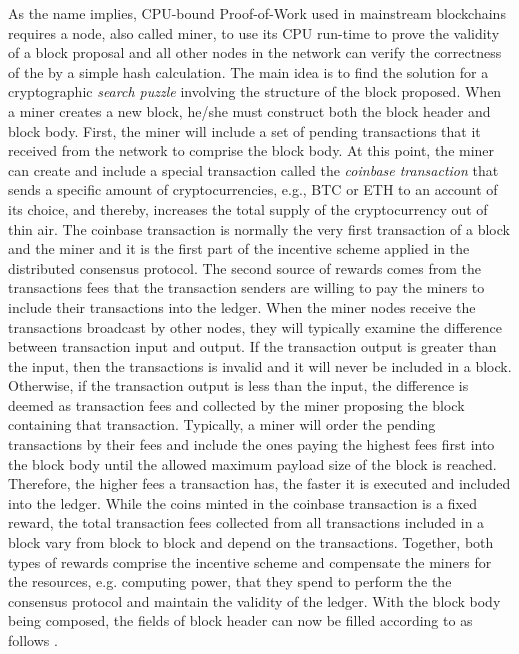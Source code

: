 As the name implies, CPU-bound Proof-of-Work used in mainstream blockchains requires a node, also called miner, to use its CPU run-time to prove the validity of a block proposal and all other nodes in the network can verify the correctness of the by a simple hash calculation. The main idea is to find the solution for a cryptographic \textit{search puzzle} involving the structure of the block proposed. When a miner creates a new block, he/she must construct both the block header and block body. First, the miner will include a set of pending transactions that it received from the network to comprise the block body. At this point, the miner can create and include a special transaction called the \textit{coinbase transaction} that sends a specific amount of cryptocurrencies, e.g., BTC or ETH to an account of its choice, and thereby, increases the total supply of the cryptocurrency out of thin air. The coinbase transaction is normally the very first transaction of a block and the miner and it is the first part of the incentive scheme applied in the distributed consensus protocol. The second source of rewards comes from the transactions fees that the transaction senders are willing to pay the miners to include their transactions into the ledger. When the miner nodes receive the transactions broadcast by other nodes, they will typically examine the difference between transaction input and output. If the transaction output is greater than the input, then the transactions is invalid and it will never be included in a block. Otherwise, if the transaction output is less than the input, the difference is deemed as transaction fees and collected by the miner proposing the block containing that transaction. Typically, a miner will order the pending transactions by their fees and include the ones paying the highest fees first into the block body until the allowed maximum payload size of the block is reached. Therefore, the higher fees a transaction has, the faster it is executed and included into the ledger. While the coins minted in the coinbase transaction is a fixed reward, the total transaction fees collected from all transactions included in a block vary from block to block and depend on the transactions. Together, both types of rewards comprise the incentive scheme and compensate the miners for the resources, e.g. computing power, that they spend to perform the the consensus protocol and maintain the validity of the ledger. With the block body being composed, the fields of block header can now be filled according to \cite{antonopoulos2017mastering} as follows .

